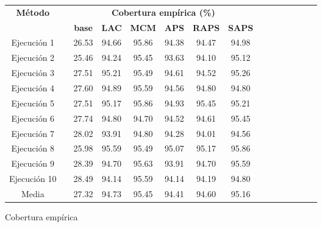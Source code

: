\renewcommand{\arraystretch}{1.4}
\begin{figure}[htbp]
    \centering

    \begin{subfigure}[b]{\textwidth}
        \small
        \centering
        \begin{tabular}{ccccccccccccccc}
        \toprule
        \multirow{2}{*}{\textbf{Método}} &  & \multicolumn{6}{c}{\textbf{Cobertura empírica (\%)}} \\ \cline{3-8} 
        &  & \textbf{base} & \textbf{LAC} & \textbf{MCM} & \textbf{APS} & \textbf{RAPS} & \textbf{SAPS} \\ \cline{1-1} \cline{3-8} 
        Ejecución 1 &  & 26.53 & 94.66 & 95.86 & 94.38 & 94.47 & 94.98 \\
        Ejecución 2 &  & 25.46 & 94.24 & 95.45 & 93.63 & 94.10 & 95.12 \\
        Ejecución 3 &  & 27.51 & 95.21 & 95.49 & 94.61 & 94.52 & 95.26 \\
        Ejecución 4 &  & 27.60 & 94.89 & 95.59 & 94.56 & 94.80 & 94.80 \\
        Ejecución 5 &  & 27.51 & 95.17 & 95.86 & 94.93 & 95.45 & 95.21 \\
        Ejecución 6 &  & 27.74 & 94.80 & 94.70 & 94.52 & 94.61 & 95.45 \\
        Ejecución 7 &  & 28.02 & 93.91 & 94.80 & 94.28 & 94.01 & 94.56 \\
        Ejecución 8 &  & 25.98 & 95.59 & 95.49 & 95.07 & 95.17 & 95.86 \\
        Ejecución 9 &  & 28.39 & 94.70 & 95.63 & 93.91 & 94.70 & 95.59 \\
        Ejecución 10 &  & 28.49 & 94.14 & 95.59 & 94.14 & 94.19 & 94.80 \\ \cline{1-1} \cline{3-8} 
        Media &  & 27.32 & 94.73 & 95.45 & 94.41 & 94.60 & 95.16 \\
        \bottomrule
        \end{tabular}
        \caption{Cobertura empírica}
        \label{tab:AGG_EC_comparative}
    \end{subfigure}

    \vspace{0.5cm}

    \begin{subfigure}[b]{\textwidth}
        \small
        \centering


\end{subfigure}
\end{figure}
